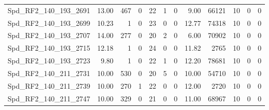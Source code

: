 \begin{longtable}[c]{@{}lrrrrrrrrrrr@{}}
Spd\_RF2\_140\_193\_2691     & 13.00                  & 467                     & 0                       & 22                     & 1                       & 0                       & 9.00                    & 66121                    & 10                       & 0                        & 0                        \\
Spd\_RF2\_140\_193\_2699     & 10.23                  & 1                       & 0                       & 23                     & 0                       & 0                       & 12.77                   & 74318                    & 10                       & 0                        & 0                        \\
Spd\_RF2\_140\_193\_2707     & 14.00                  & 277                     & 0                       & 20                     & 2                       & 0                       & 6.00                    & 70902                    & 10                       & 0                        & 0                        \\
Spd\_RF2\_140\_193\_2715     & 12.18                  & 1                       & 0                       & 24                     & 0                       & 0                       & 11.82                   & 2765                     & 10                       & 0                        & 0                        \\
Spd\_RF2\_140\_193\_2723     & 9.80                   & 1                       & 0                       & 22                     & 1                       & 0                       & 12.20                   & 78681                    & 10                       & 0                        & 0                        \\
Spd\_RF2\_140\_211\_2731     & 10.00                  & 530                     & 0                       & 20                     & 5                       & 0                       & 10.00                   & 54710                    & 10                       & 0                        & 0                        \\
Spd\_RF2\_140\_211\_2739     & 10.00                  & 270                     & 1                       & 22                     & 0                       & 0                       & 12.00                   & 2720                     & 10                       & 0                        & 0                        \\
Spd\_RF2\_140\_211\_2747     & 10.00                  & 329                     & 0                       & 21                     & 0                       & 0                       & 11.00                   & 68967                    & 10                       & 0                        & 0                        \\

\end{longtable}
